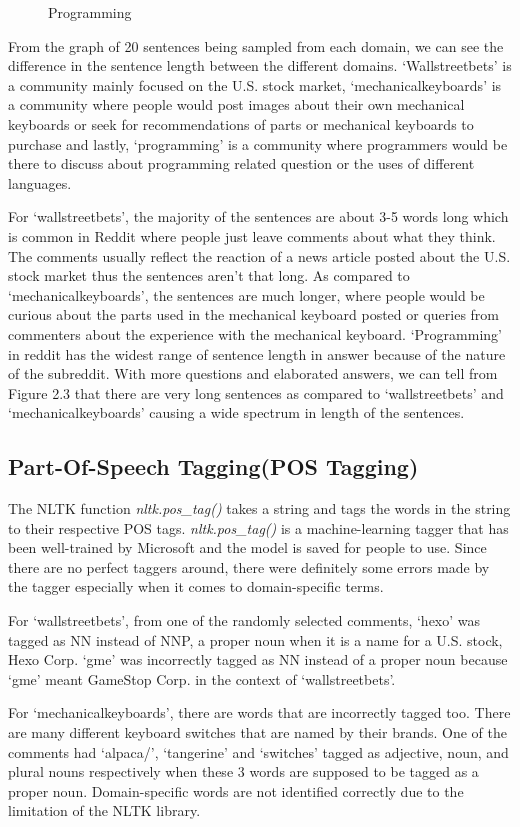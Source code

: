 \documentclass[sigconf,nonacm=true]{acmart}
\begin{document}
\begin{figure}[H]
	\caption{Programming}
\end{figure}
From the graph of 20 sentences being sampled from each domain, we can see the difference in the sentence length between the different domains. ‘Wallstreetbets’ is a community mainly focused on the U.S. stock market, ‘mechanicalkeyboards’ is a community where people would post images about their own mechanical keyboards or seek for recommendations of parts or mechanical keyboards to purchase and lastly, ‘programming’ is a community where programmers would be there to discuss about programming related question or the uses of different languages. \smallskip

For ‘wallstreetbets’, the majority of the sentences are about 3-5 words long which is common in Reddit where people just leave comments about what they think. The comments usually reflect the reaction of a news article posted about the U.S. stock market thus the sentences aren’t that long. As compared to ‘mechanicalkeyboards’, the sentences are much longer, where people would be curious about the parts used in the mechanical keyboard posted or queries from commenters about the experience with the mechanical keyboard. ‘Programming’ in reddit has the widest range of sentence length in answer because of the nature of the subreddit. With more questions and elaborated answers, we can tell from Figure 2.3 that there are very long sentences as compared to ‘wallstreetbets’ and ‘mechanicalkeyboards’ causing a wide spectrum in length of the sentences.
\subsection{Part-Of-Speech Tagging(POS Tagging)}
The NLTK function \textit{nltk.pos\_tag()} takes a string and tags the words in the string to their respective POS tags. \textit{nltk.pos\_tag()} is a machine-learning tagger that has been well-trained by Microsoft and the model is saved for people to use. Since there are no perfect taggers around, there were definitely some errors made by the tagger especially when it comes to domain-specific terms.

For ‘wallstreetbets’, from one of the randomly selected comments, ‘hexo’ was tagged as NN instead of NNP, a proper noun when it is a name for a U.S. stock, Hexo Corp. ‘gme’ was incorrectly tagged as NN instead of a proper noun because ‘gme’ meant GameStop Corp. in the context of ‘wallstreetbets’.

For ‘mechanicalkeyboards’, there are words that are incorrectly tagged too. There are many different keyboard switches that are named by their brands. One of the comments had ‘alpaca/’, ‘tangerine’ and ‘switches’ tagged as adjective, noun, and plural nouns respectively when these 3 words are supposed to be tagged as a proper noun. Domain-specific words are not identified correctly due to the limitation of the NLTK library.
\end{document}
